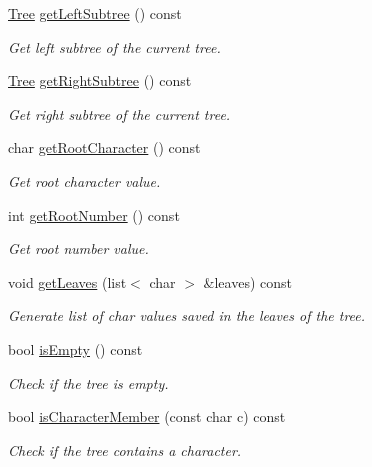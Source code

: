 \begin{DoxyCompactItemize}
\mbox{\hyperlink{class_tree}{Tree}} \mbox{\hyperlink{class_tree_a768a4e55608dd9e86a21801de9047128}{get\+Left\+Subtree}} () const
\begin{DoxyCompactList}\small\item\em Get left subtree of the current tree. \end{DoxyCompactList}\item 
\mbox{\hyperlink{class_tree}{Tree}} \mbox{\hyperlink{class_tree_a497e24d0d17e19918a50146ad5f8bf03}{get\+Right\+Subtree}} () const
\begin{DoxyCompactList}\small\item\em Get right subtree of the current tree. \end{DoxyCompactList}\item 
char \mbox{\hyperlink{class_tree_aa555328592d942644e3046094dfcb15c}{get\+Root\+Character}} () const
\begin{DoxyCompactList}\small\item\em Get root character value. \end{DoxyCompactList}\item 
int \mbox{\hyperlink{class_tree_afddbbbdd7a2b6b94c1fa06421dc3659a}{get\+Root\+Number}} () const
\begin{DoxyCompactList}\small\item\em Get root number value. \end{DoxyCompactList}\item 
void \mbox{\hyperlink{class_tree_ae8d23cf626ec0c79da63d50407027127}{get\+Leaves}} (list$<$ char $>$ \&leaves) const
\begin{DoxyCompactList}\small\item\em Generate list of char values saved in the leaves of the tree. \end{DoxyCompactList}\item 
bool \mbox{\hyperlink{class_tree_a555c9f251517225769a022db5987ef47}{is\+Empty}} () const
\begin{DoxyCompactList}\small\item\em Check if the tree is empty. \end{DoxyCompactList}\item 
bool \mbox{\hyperlink{class_tree_aa1109a75294849e0560ff762b5564f64}{is\+Character\+Member}} (const char c) const
\begin{DoxyCompactList}\small\item\em Check if the tree contains a character. \end{DoxyCompactList}\item 

\end{DoxyCompactItemize}
